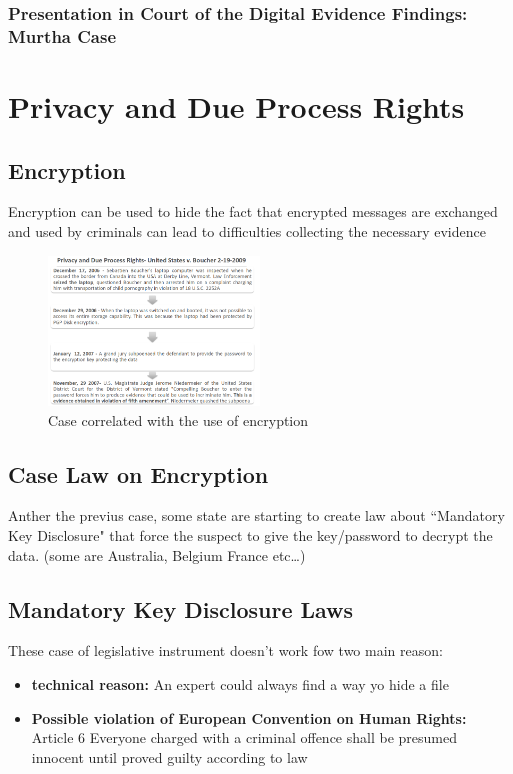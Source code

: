 \subsubsection{Presentation in Court of the Digital Evidence Findings: Murtha Case}


\section{Privacy and Due Process Rights}

\subsection{Encryption}
Encryption can be used to hide the fact that encrypted messages are exchanged and used by criminals can lead to difficulties collecting the necessary evidence

\begin{figure}[!ht]
  \centering
  \includegraphics[width=0.5\textwidth]{img/enc_case.png}
  \caption{Case correlated with the use of encryption}
  \label{fig:encryption process}
\end{figure}

\newpage
\subsection{Case Law on Encryption}
Anther the previus case, some state are starting to create law about “Mandatory Key Disclosure" that force the suspect to give the key/password to decrypt the data. (some are Australia, Belgium France etc\dots)

\subsection{Mandatory Key Disclosure Laws}
These case of legislative instrument doesn't work fow two main reason:
\begin{itemize}
  \item \textbf{technical reason:} An expert could always find a way yo hide a file
  \item \textbf{Possible violation of European Convention on Human Rights:} Article 6 Everyone charged with a criminal offence shall be presumed innocent until proved guilty according to law
\end{itemize}

